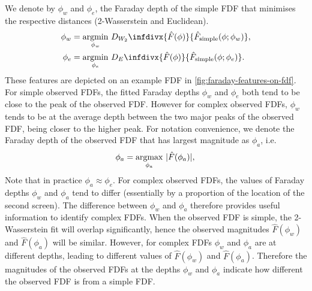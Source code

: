 \documentclass[11pt, a4paper]{book}
\begin{document}
    We denote by $\phi_w$ and $\phi_e$, the Faraday depth of the simple FDF that minimises the respective distances
    (2-Wasserstein and Euclidean).
    \begin{align*}
       \phi_w &= \underset{\phi_w}{\mathrm{argmin}}\ D_{W_2}\infdivx{\hat F(\phi)}{\hat F_{\mathrm{simple}}(\phi; \phi_w)},\\
       \phi_e &= \underset{\phi_e}{\mathrm{argmin}}\ D_E\infdivx{\hat F(\phi)}{\hat F_{\mathrm{simple}}(\phi; \phi_e)}.
     \end{align*}
     These features are depicted on an example FDF in \autoref{fig:faraday-features-on-fdf}.
     For simple observed FDFs, the fitted Faraday depths $\phi_w$ and $\phi_e$ both tend to be
     close to the peak of the observed FDF. However for complex observed FDFs, $\phi_w$ tends
     to be at the average depth between the two major peaks of the observed FDF, being closer
     to the higher peak. For notation convenience, we denote the Faraday depth of the
     observed FDF that has largest magnitude as $\phi_a$, i.e.
     \begin{equation*}
       \phi_a = \underset{\phi_a}{\mathrm{argmax}}\ |\hat F(\phi_a)|,\\
     \end{equation*}
     Note that in practice $\phi_a \approx \phi_e$.
     For complex observed FDFs, the values of Faraday depths $\phi_w$ and $\phi_a$ tend
     to differ (essentially by a proportion of the location of the second screen).
     The difference between $\phi_w$ and $\phi_a$ therefore provides useful information
     to identify complex FDFs.
     When the observed FDF is simple, the 2-Wasserstein fit will overlap significantly,
     hence the observed magnitudes $\hat F(\phi_w)$ and $\hat F(\phi_a)$ will be similar.
     However, for complex FDFs $\phi_w$ and $\phi_a$ are at different depths,
     leading to different values of $\hat F(\phi_w)$ and $\hat F(\phi_a)$.
     Therefore the magnitudes of the observed FDFs at the depths $\phi_w$ and $\phi_a$
     indicate how different the observed FDF is from a simple FDF.
\end{document}
